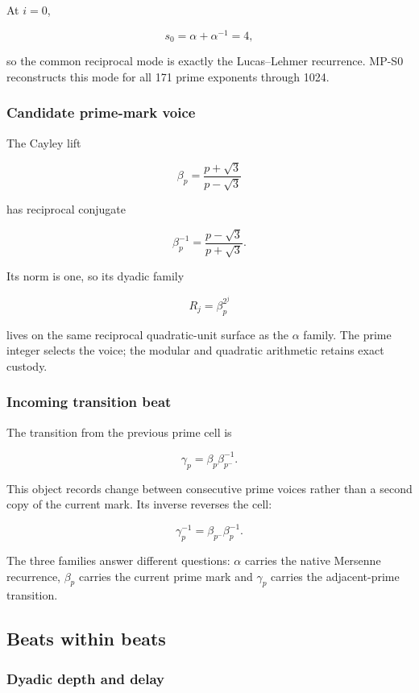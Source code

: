 At \(i=0\),

\[
s_0=\alpha+\alpha^{-1}=4,
\]

so the common reciprocal mode is exactly the Lucas--Lehmer recurrence.
MP-S0 reconstructs this mode for all 171 prime exponents through 1024.

\subsubsection{Candidate prime-mark
voice}\label{viii-ch10-candidate-prime-mark-voice}

The Cayley lift

\[
\beta_p=\frac{p+\sqrt3}{p-\sqrt3}
\]

has reciprocal conjugate

\[
\beta_p^{-1}=\frac{p-\sqrt3}{p+\sqrt3}.
\]

Its norm is one, so its dyadic family

\[
R_j=\beta_p^{2^j}
\]

lives on the same reciprocal quadratic-unit surface as the \(\alpha\)
family. The prime integer selects the voice; the modular and quadratic
arithmetic retains exact custody.

\subsubsection{Incoming transition beat}\label{viii-ch10-incoming-transition-beat}

The transition from the previous prime cell is

\[
\gamma_p=\beta_p\beta_{p^-}^{-1}.
\]

This object records change between consecutive prime voices rather than
a second copy of the current mark. Its inverse reverses the cell:

\[
\gamma_p^{-1}=\beta_{p^-}\beta_p^{-1}.
\]

The three families answer different questions: \(\alpha\) carries the
native Mersenne recurrence, \(\beta_p\) carries the current prime mark
and \(\gamma_p\) carries the adjacent-prime transition.

\subsection{Beats within beats}\label{viii-ch10-beats-within-beats}

\subsubsection{Dyadic depth and delay}\label{viii-ch10-dyadic-depth-and-delay}

